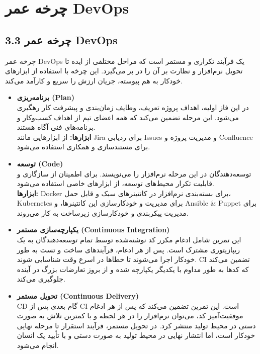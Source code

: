 \section{چرخه عمر DevOps}
\subsection*{3.3 چرخه عمر DevOps}
چرخه عمر DevOps یک فرآیند تکراری و مستمر است که مراحل مختلفی از ایده تا تحویل نرم‌افزار و نظارت بر آن را در بر می‌گیرد. این چرخه با استفاده از ابزارهای خودکار به هم پیوسته، جریان ارزش را سریع و کارآمد می‌کند.

\begin{itemize}
    \item \textbf{برنامه‌ریزی (Plan)} \\
    در این فاز اولیه، اهداف پروژه تعریف، وظایف زمان‌بندی و پیشرفت کار رهگیری می‌شود. این مرحله تضمین می‌کند که همه اعضای تیم از اهداف کسب‌وکار و برنامه‌های فنی آگاه هستند. \\
    \textbf{ابزارها:} از ابزارهایی مانند Jira برای ردیابی Issues و مدیریت پروژه و Confluence برای مستندسازی و همکاری استفاده می‌شود.

    \item \textbf{توسعه (Code)} \\
    توسعه‌دهندگان در این مرحله نرم‌افزار را می‌نویسند. برای اطمینان از سازگاری و قابلیت تکرار محیط‌های توسعه، از ابزارهای خاصی استفاده می‌شود. \\
    \textbf{ابزارها:} Docker برای بسته‌بندی نرم‌افزار در کانتینرهای سبک و قابل حمل، Kubernetes برای مدیریت و خودکارسازی این کانتینرها، و Ansible \& Puppet برای مدیریت پیکربندی و خودکارسازی زیرساخت به کار می‌روند.

    \item \textbf{یکپارچه‌سازی مستمر (Continuous Integration)} \\
    این تمرین شامل ادغام مکرر کد نوشته‌شده توسط تمام توسعه‌دهندگان به یک ریپازیتوری مشترک است. پس از هر ادغام، فرآیندهای ساخت و تست به طور خودکار اجرا می‌شوند تا خطاها در اسرع وقت شناسایی شوند. CI تضمین می‌کند که کدها به طور مداوم با یکدیگر یکپارچه شده و از بروز تعارضات بزرگ در آینده جلوگیری می‌کند.

    \item \textbf{تحویل مستمر (Continuous Delivery)} \\
    CD گام بعدی پس از CI است. این تمرین تضمین می‌کند که پس از هر ادغام موفقیت‌آمیز کد، می‌توان نرم‌افزار را در هر لحظه و با کمترین تلاش به صورت دستی در محیط تولید منتشر کرد. در تحویل مستمر، فرآیند استقرار تا مرحله نهایی خودکار است، اما انتشار نهایی در محیط تولید به صورت دستی و با تأیید یک انسان انجام می‌شود.


\end{itemize}
